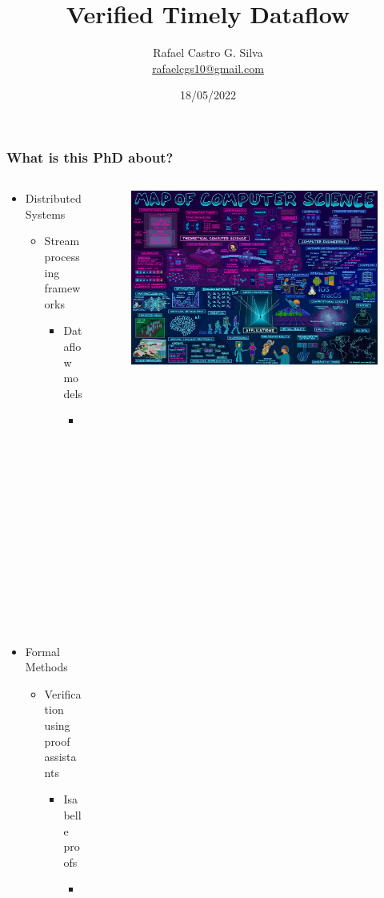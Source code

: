 \documentclass[aspectratio=169,10pt]{beamer}
\title[Verified Timely Dataflow]{Verified Timely Dataflow}
\author[Rafael Castro]{
  Rafael Castro G. Silva\\\medskip
  {\small \url{rafaelcgs10@gmail.com}}}
\date{18/05/2022}
\institute[UCPH]{
  Computer Science Department \\
  Copenhagen University}
\begin{document}
\begin{frame}
  \titlepage

\end{frame}

\begin{frame}[fragile]
  \frametitle{What is this PhD about?}
  \begin{columns}
    \begin{column}{0.45\textwidth}
      \begin{itemize}
        \item Distributed Systems
              \begin{itemize}
                \item Stream processing frameworks
                      \begin{itemize}
                        \item Dataflow models
                              \begin{itemize}
                                \item Timely Dataflow
                              \end{itemize}
                      \end{itemize}
              \end{itemize}
        \item Formal Methods
              \begin{itemize}
                \item Verification using proof assistants
                      \begin{itemize}
                        \item Isabelle proofs
                              \begin{itemize}
                                \item Verified and executable code
                              \end{itemize}
                      \end{itemize}
              \end{itemize}
      \end{itemize}
    \end{column}
    \begin{column}{0.55\textwidth}
      \begin{figure}
      \includegraphics[width=1\textwidth]{map.jpg}

\end{figure}
\end{column}
\end{columns}
\end{frame}
\end{document}
